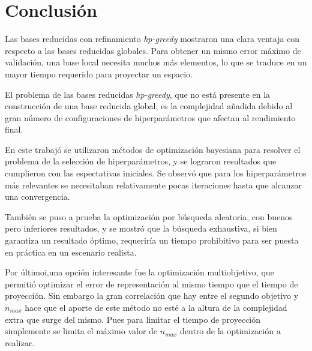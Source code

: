 \chapter{Conclusión}

Las bases reducidas con refinamiento \textit{hp-greedy} mostraron una clara ventaja con respecto a las bases reducidas globales. Para obtener un mismo error máximo de validación, una base local necesita muchos más elementos, lo que se traduce en un mayor tiempo requerido para proyectar un espacio.

El problema de las bases reducidas \textit{hp-greedy}, que no está presente en la construcción de una base reducida global, es la complejidad añadida debido al gran número de configuraciones de hiperparámetros que afectan al rendimiento final. 


En este trabajó se utilizaron métodos de optimización bayesiana para resolver el problema de la selección de hiperparámetros, y se lograron resultados que cumplieron con las espectativas iniciales. Se observó que para los hiperparámetros más relevantes se necesitaban relativamente pocas iteraciones hasta que alcanzar una convergencia.

También se puso a prueba la optimización por búsqueda aleatoria, con buenos pero inferiores resultados, y se mostró que la búsqueda exhaustiva, si bien garantiza un resultado óptimo, requeriría un tiempo prohibitivo para ser puesta en práctica en un escenario realista.


Por últimoi,una opción interesante fue la optimización multiobjetivo, que permitió optimizar el error de representación al mismo tiempo que el tiempo de proyección. Sin embargo la gran correlación que hay entre el segundo objetivo y $n_{max}$ hace que el aporte de este método no esté a la altura de la complejidad extra que surge del mismo. Pues para limitar el tiempo de proyección simplemente se limita el máximo valor de $n_{max}$ dentro de la optimización a realizar.



